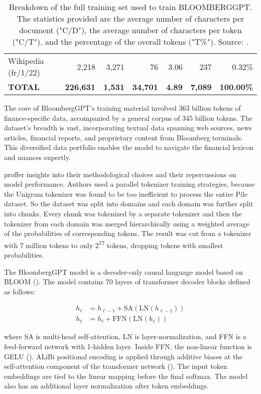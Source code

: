 \begin{table}[!h]
\begin{tabularx}{\textwidth}{lrrrrrr}
		Wikipedia (fr/1/22) & 2,218            & 3,271          & 76              & 3.06          & 237            & 0.32\%            \\
		\textbf{TOTAL}      & \textbf{226,631} & \textbf{1,531} & \textbf{34,701} & \textbf{4.89} & \textbf{7,089} & \textbf{100.00\%} \\
		\bottomrule
	\end{tabularx}
	\caption{Breakdown of the full training set used to train BLOOMBERGGPT. The statistics provided are the average number of characters per document ("C/D"), the average number of characters per token ("C/T"), and the percentage of the overall tokens ("T\%"). Source: \protect\textcite{wu2023bloomberggpt}.}
	\label{tab:training_set}
\end{table}

The core of BloombergGPT's training material involved 363 billion tokens of finance-specific data, accompanied by a general corpus of 345 billion tokens.
The dataset's breadth is vast, incorporating textual data spanning web sources, news articles, financial reports, and proprietary content from Bloomberg terminals.
This diversified data portfolio enables the model to navigate the financial lexicon and nuances expertly.

\textcite{wu2023bloomberggpt} proffer insights into their methodological choices and their repercussions on model performance.
Authors used a parallel tokenizer training strategies, because the Unigram tokenizer was found to be too inefficient to process the entire Pile dataset.
So the dataset was split into domains and each domain was further split into chunks.
Every chunk was tokenized by a separate tokenizer and then the tokenizer from each domain was merged hierarchically using a weighted average of the probabilities of corresponding tokens.
The result was cut from a tokenizer with 7 million tokens to only 2\textsuperscript{17} tokens, dropping tokens with smallest probabilities.

The BloombergGPT model is a decoder-only causal language model based on BLOOM (\textcite{workshop2023bloom}).
The model contains 70 layers of transformer decoder blocks defined as follows:

\begin{align*}
	h_{\ell} & = h_{\ell-1} + \text{SA}(\text{LN}(h_{\ell-1})) \\
	h_{\ell} & = h_{\ell} + \text{FFN}(\text{LN}(h_{\ell}))
\end{align*}

where SA is multi-head self-attention, LN is layer-normalization, and FFN is a feed-forward network with 1-hidden layer.
Inside FFN, the non-linear function is GELU (\textcite{hendrycks2016gelu}).
ALiBi positional encoding is applied through additive biases at the self-attention component of the transformer network (\textcite{lescao2022milliongpuhours}). The input token embeddings are tied to the linear mapping before the final softmax.
The model also has an additional layer normalization after token embeddings.

